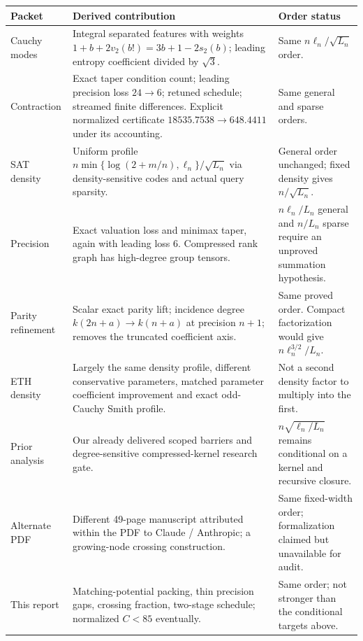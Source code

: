 \documentclass[11pt,letterpaper]{article}
\begin{document}
\begin{longtable}{@{}p{}p{}p{}@{}}
\toprule
Packet & Derived contribution & Order status\\\midrule\endhead
Cauchy modes & Integral separated features with weights
$1+b+2v_2(b!)=3b+1-2s_2(b)$; leading entropy coefficient divided by $\sqrt3$.
& Same $n\ell_n/\sqrt{L_n}$ order.\\[5pt]
Contraction & Exact taper condition count; leading precision loss $24\to6$;
retuned schedule; streamed finite differences. Explicit normalized certificate
$18535.7538\to648.4411$ under its accounting.
& Same general and sparse orders.\\[5pt]
SAT density & Uniform profile
$n\min\{\log(2+m/n),\ell_n\}/\sqrt{L_n}$ via density-sensitive codes and actual query sparsity.
& General order unchanged; fixed density gives $n/\sqrt{L_n}$.\\[5pt]
Precision & Exact valuation loss and minimax taper, again with leading loss $6$.
Compressed rank graph has high-degree group tensors.
& $n\ell_n/L_n$ general and $n/L_n$ sparse require an unproved summation hypothesis.\\[5pt]
Parity refinement & Scalar exact parity lift; incidence degree
$k(2n+a)\to k(n+a)$ at precision $n+1$; removes the truncated coefficient axis.
& Same proved order. Compact factorization would give $n\ell_n^{3/2}/L_n$.\\[5pt]
ETH density & Largely the same density profile, different conservative parameters,
matched parameter coefficient improvement and exact odd-Cauchy Smith profile.
& Not a second density factor to multiply into the first.\\[5pt]
Prior analysis & Our already delivered scoped barriers and degree-sensitive
compressed-kernel research gate.
& $n\sqrt{\ell_n/L_n}$ remains conditional on a kernel and recursive closure.\\[5pt]
Alternate PDF & Different 49-page manuscript attributed within the PDF to
Claude / Anthropic; a growing-node crossing construction.
& Same fixed-width order; formalization claimed but unavailable for audit.\\[5pt]
This report & Matching-potential packing, thin precision gaps, crossing fraction,
two-stage schedule; normalized $C<85$ eventually.
& Same order; not stronger than the conditional targets above.\\\bottomrule
\end{longtable}
\end{document}
